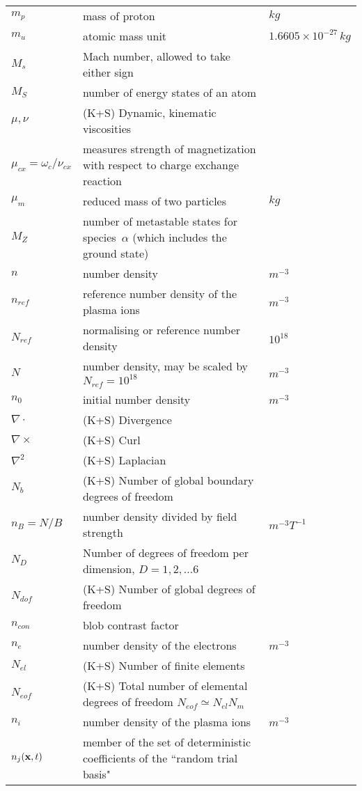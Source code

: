 \begin{longtable}{|p{3.0cm}|p{10.0cm}|p{3.0cm}|}
$m_p$ & mass of proton & $kg$ \\
$m_u$ & atomic mass unit & $1.6605 \times 10^{-27}\,kg$ \\
$M_s$ & Mach number, allowed to take either sign & \\
$M_S$ & number of energy states of an atom & \\
$\mu, \nu$ &  (K+S) Dynamic, kinematic viscosities & \\
$\mu_{cx}=\omega_c/\nu_{cx}$ & measures strength of magnetization with respect to charge exchange reaction & \\
$\mu_m$ & reduced mass of two particles & $kg$ \\
$M_Z$ & number of metastable states for species~$\alpha$ (which includes the ground state) & \\
$n$ & number density & $m^{-3}$ \\
$n_{ref}$ & reference number density of the plasma ions & $m^{-3}$ \\
$N_{ref} $ & normalising or reference number density & $10^{18}$  \\
$N$ & number density, may be scaled by $N_{ref}=10^{18}$ & $m^{-3}$ \\
$n_0$ & initial number density & $m^{-3}$ \\
$\nabla \cdot$ &  (K+S) Divergence & \\
$\nabla \times$ &  (K+S) Curl & \\
$\nabla^2$ &  (K+S) Laplacian & \\
$N_{b}$ &  (K+S) Number of global boundary degrees of freedom & \\
$n_B=N/B$ & number density divided by field strength & $m^{-3}T^{-1}$ \\
$N_D$ &  Number of degrees of freedom per dimension, $D=1,2,\ldots6$ & \\
$N_{dof}$ &  (K+S) Number of global degrees of freedom & \\
$n_{con}$ & blob contrast factor  &  \\
$n_e$ & number density of the electrons & $m^{-3}$ \\
$N_{el}$ &  (K+S) Number of finite elements & \\
$N_{eof}$ &  (K+S) Total number of elemental degrees of freedom $N_{eof} \simeq N_{el}N_m$ & \\
$n_i$ & number density of the plasma ions & $m^{-3}$ \\
$n_j({\bf x},t)$ & member of the set of deterministic coefficients of the ``random trial basis" & \\

\end{longtable}
